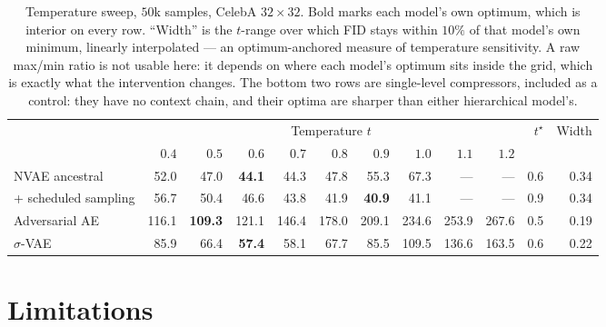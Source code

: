 \documentclass[sigconf,nonacm]{acmart}
\newcommand{\best}[1]{\textbf{#1}}
\begin{document}
\begin{table}[t]
\caption{Temperature sweep, $50$k samples, CelebA $32{\times}32$. Bold marks
each model's own optimum, which is interior on every row. ``Width'' is the
$t$-range over which FID stays within $10\%$ of that model's own minimum,
linearly interpolated --- an optimum-anchored measure of temperature
sensitivity. A raw max/min ratio is not usable here: it depends on where each
model's optimum sits inside the grid, which is exactly what the intervention
changes. The bottom two rows are single-level compressors, included as a
control: they have no context chain, and their optima are sharper than either
hierarchical model's.}
\label{tab:temp}
\small
\setlength{\tabcolsep}{3.0pt}
\begin{tabular}{lrrrrrrrrrrr}
\toprule
 & \multicolumn{9}{c}{Temperature $t$} & $t^\star$ & Width \\
\cmidrule(lr){2-10}
 & $0.4$ & $0.5$ & $0.6$ & $0.7$ & $0.8$ & $0.9$ & $1.0$ & $1.1$ & $1.2$ & & \\
\midrule
NVAE ancestral & 52.0 & 47.0 & \best{44.1} & 44.3 & 47.8 & 55.3 & 67.3 & --- & --- & 0.6 & 0.34 \\
\;\;+ scheduled sampling & 56.7 & 50.4 & 46.6 & 43.8 & 41.9 & \best{40.9} & 41.1 & --- & --- & 0.9 & 0.34 \\
\midrule
Adversarial AE & 116.1 & \best{109.3} & 121.1 & 146.4 & 178.0 & 209.1 & 234.6 & 253.9 & 267.6 & 0.5 & 0.19 \\
$\sigma$-VAE & 85.9 & 66.4 & \best{57.4} & 58.1 & 67.7 & 85.5 & 109.5 & 136.6 & 163.5 & 0.6 & 0.22 \\
\bottomrule
\end{tabular}
\end{table}

\section{Limitations}
\label{sec:limits}
\end{document}
